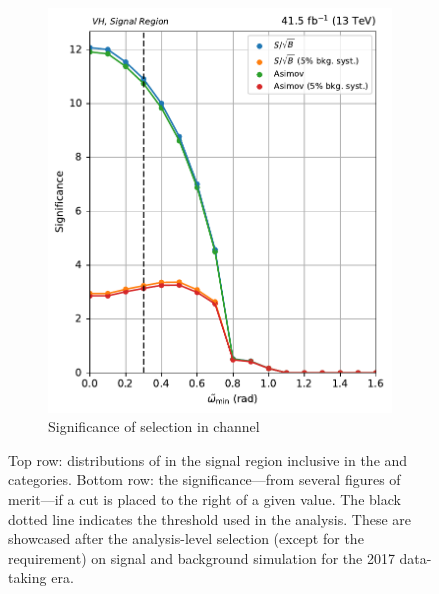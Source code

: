 \begin{figure}[htbp]
\begin{subfigure}[b]{0.47\textwidth}
        \includegraphics[width=\textwidth]{figures/category_optimisations/with_mindphi_cut/significance_VH_min_omega_tilde_all.pdf}
        \caption{Significance of selection in \VH channel}
    \end{subfigure}
    \caption[Distributions of \omegaTilde in the signal region inclusive in the \ttH and \VH categories, along with the significance---from several figures of merit---if a cut is placed to the right of a given value]{Top row: distributions of \omegaTilde in the signal region inclusive in the \ttH and \VH categories. Bottom row: the significance---from several figures of merit---if a cut is placed to the right of a given value. The black dotted line indicates the threshold used in the analysis. These are showcased after the analysis-level selection (except for the \mindphi requirement) on signal and background simulation for the 2017 data-taking era.}
    \label{fig:htoinv_category_optimisations_significances}
\end{figure}

